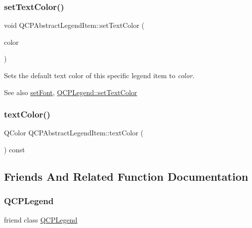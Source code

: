 \subsubsection{\texorpdfstring{set\+Text\+Color()}{setTextColor()}}
{\footnotesize\ttfamily void Q\+C\+P\+Abstract\+Legend\+Item\+::set\+Text\+Color (\begin{DoxyParamCaption}\item[{const Q\+Color \&}]{color }\end{DoxyParamCaption})}

Sets the default text color of this specific legend item to {\itshape color}.

\begin{DoxySeeAlso}{See also}
\hyperlink{class_q_c_p_abstract_legend_item_a409c53455d8112f71d70c0c43eb10265}{set\+Font}, \hyperlink{class_q_c_p_legend_ae1eb239ff4a4632fe1b6c3e668d845c6}{Q\+C\+P\+Legend\+::set\+Text\+Color} 
\end{DoxySeeAlso}
\mbox{\label{class_q_c_p_abstract_legend_item_a35b35fa697dcece86cf7e5818c0820b2}} 
\subsubsection{\texorpdfstring{text\+Color()}{textColor()}}
{\footnotesize\ttfamily Q\+Color Q\+C\+P\+Abstract\+Legend\+Item\+::text\+Color (\begin{DoxyParamCaption}{ }\end{DoxyParamCaption}) const\hspace{0.3cm}{\ttfamily [inline]}}



\subsection{Friends And Related Function Documentation}
\mbox{\label{class_q_c_p_abstract_legend_item_a8429035e7adfbd7f05805a6530ad5e3b}} 
\subsubsection{\texorpdfstring{Q\+C\+P\+Legend}{QCPLegend}}
{\footnotesize\ttfamily friend class \hyperlink{class_q_c_p_legend}{Q\+C\+P\+Legend}\hspace{0.3cm}{\ttfamily [friend]}}



